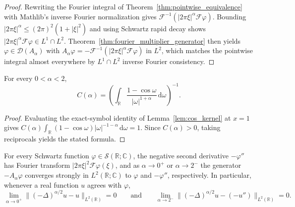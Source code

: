 \begin{proof}
\leanok
Rewriting the Fourier integral of Theorem~\ref{thm:pointwise_equivalence} with Mathlib's inverse Fourier normalization gives $\mathcal{F}^{-1}(\lvert 2\pi\xi \rvert^\alpha \mathcal{F}\varphi)$. Bounding $\lvert 2\pi\xi \rvert^\alpha \le (2\pi)^2(1 + \lvert \xi \rvert^2)$ and using Schwartz rapid decay shows $\lvert 2\pi\xi \rvert^\alpha \mathcal{F}\varphi \in L^1 \cap L^2$. Theorem~\ref{thm:fourier_multiplier_generator} then yields $\varphi \in \mathcal{D}(A_\alpha)$ with $A_\alpha \varphi = -\mathcal{F}^{-1}(\lvert 2\pi\xi \rvert^\alpha \mathcal{F}\varphi)$ in $L^2$, which matches the pointwise integral almost everywhere by $L^1 \cap L^2$ inverse Fourier consistency.
\end{proof}

\begin{theorem}\label{thm:frac_lap_constant_integral}
\leanok
For every $0 < \alpha < 2$,
\[
  C(\alpha) = \left( \int_{\mathbb{R}} \frac{1 - \cos \omega}{\lvert \omega \rvert^{1 + \alpha}}\, \mathrm{d}\omega \right)^{-1}.
\]
\end{theorem}

\begin{proof}
\leanok
Evaluating the exact-symbol identity of Lemma~\ref{lem:cos_kernel} at $x = 1$ gives $C(\alpha) \int_{\mathbb{R}} (1 - \cos \omega) \lvert \omega \rvert^{-1-\alpha}\, \mathrm{d}\omega = 1$. Since $C(\alpha) > 0$, taking reciprocals yields the stated formula.
\end{proof}

\begin{theorem}\label{thm:pointwise_endpoint_limits}
\leanok
For every Schwartz function $\varphi \in \mathcal{S}(\mathbb{R}; \mathbb{C})$, the negative second derivative $-\varphi''$ has Fourier transform $\lvert 2\pi\xi \rvert^2 \mathcal{F}\varphi(\xi)$, and as $\alpha \to 0^+$ or $\alpha \to 2^-$ the generator $-A_\alpha \varphi$ converges strongly in $L^2(\mathbb{R}; \mathbb{C})$ to $\varphi$ and $-\varphi''$, respectively. In particular, whenever a real function $u$ agrees with $\varphi$,
\[
  \lim_{\alpha \to 0^+} \lVert (-\Delta)^{\alpha/2} u - u \rVert_{L^2(\mathbb{R})} = 0
  \qquad \text{and} \qquad
  \lim_{\alpha \to 2^-} \lVert (-\Delta)^{\alpha/2} u - (-u'') \rVert_{L^2(\mathbb{R})} = 0.
\]
\end{theorem}

